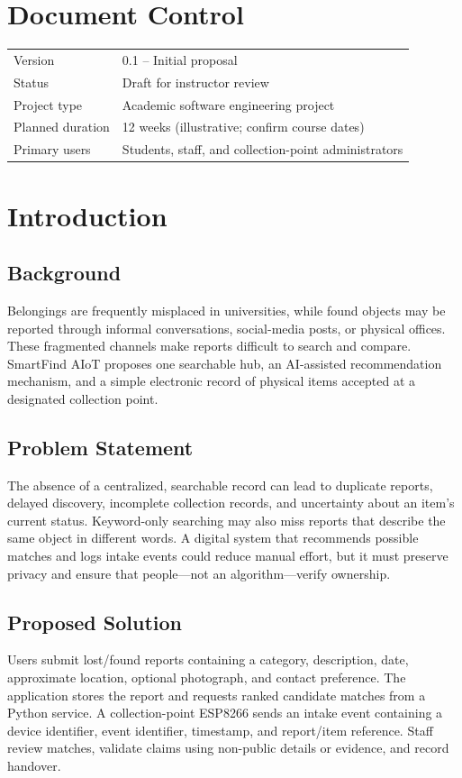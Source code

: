 \documentclass[12pt,a4paper]{report}
\begin{document}
\chapter*{Document Control}
\begin{tabular}{ll}
Version & 0.1 -- Initial proposal\\
Status & Draft for instructor review\\
Project type & Academic software engineering project\\
Planned duration & 12 weeks (illustrative; confirm course dates)\\
Primary users & Students, staff, and collection-point administrators\\
\end{tabular}

\tableofcontents
\listoftables
\clearpage
{}

\chapter{Introduction}
\section{Background}
Belongings are frequently misplaced in universities, while found objects may be reported through informal conversations, social-media posts, or physical offices. These fragmented channels make reports difficult to search and compare. SmartFind AIoT proposes one searchable hub, an AI-assisted recommendation mechanism, and a simple electronic record of physical items accepted at a designated collection point.

\section{Problem Statement}
The absence of a centralized, searchable record can lead to duplicate reports, delayed discovery, incomplete collection records, and uncertainty about an item's current status. Keyword-only searching may also miss reports that describe the same object in different words. A digital system that recommends possible matches and logs intake events could reduce manual effort, but it must preserve privacy and ensure that people—not an algorithm—verify ownership.

\section{Proposed Solution}
Users submit lost/found reports containing a category, description, date, approximate location, optional photograph, and contact preference. The application stores the report and requests ranked candidate matches from a Python service. A collection-point ESP8266 sends an intake event containing a device identifier, event identifier, timestamp, and report/item reference. Staff review matches, validate claims using non-public details or evidence, and record handover.
\end{document}
